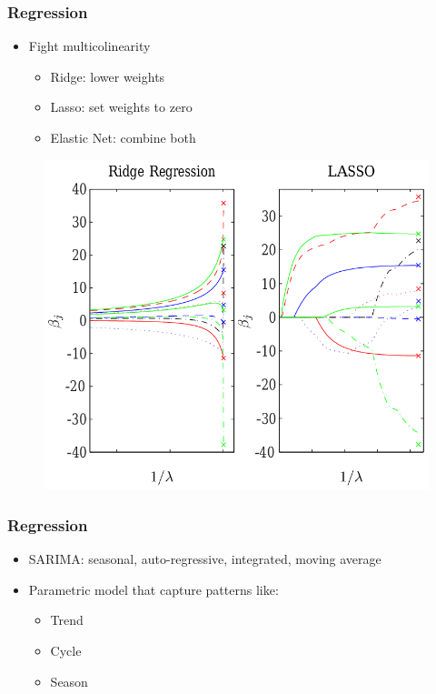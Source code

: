 \begin{frame}\frametitle{Regression}
   \begin{itemize}
      \item Fight multicolinearity
      \begin{itemize}
         \item Ridge: lower weights
         \item Lasso: set weights to zero
         \item Elastic Net: combine both
      \end{itemize}
   \end{itemize}
   \begin{figure}[H]
      \includegraphics[scale=.23]{../images/illustrations/model_ridge_lasso.png}
   \end{figure}
\end{frame}


\begin{frame}\frametitle{Regression}
   \begin{itemize}
      \item SARIMA: seasonal, auto-regressive, integrated, moving average
      \item Parametric model that capture patterns like:
      \begin{itemize}
         \item Trend
         \item Cycle
         \item Season
      \end{itemize}
   \end{itemize}
\end{frame}


